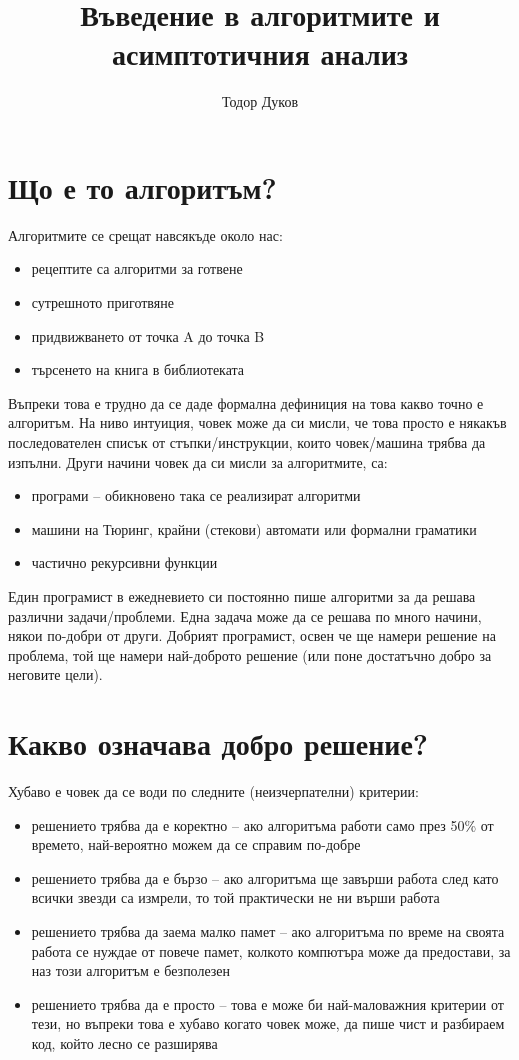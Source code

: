 \documentclass{article}
\title{Въведение в алгоритмите и асимптотичния анализ}
\author{Тодор Дуков}
\date{}
\theoremstyle{definition}
\theoremstyle{plain}
\theoremstyle{remark}
\theoremstyle{definition}
\begin{document}
\maketitle

\section*{Що е то алгоритъм?}

Алгоритмите се срещат навсякъде около нас:
\begin{itemize}
  \item рецептите са алгоритми за готвене
  \item сутрешното приготвяне
  \item придвижването от точка A до точка B
  \item търсенето на книга в библиотеката
\end{itemize}

Въпреки това е трудно да се даде формална дефиниция на това какво точно е алгоритъм.
На ниво интуиция, човек може да си мисли, че това просто е някакъв последователен списък от стъпки/инструкции, които човек/машина трябва да изпълни.
Други начини човек да си мисли за алгоритмите, са:
\begin{itemize}
  \item програми -- обикновено така се реализират алгоритми
  \item машини на Тюринг, крайни (стекови) автомати или формални граматики
  \item частично рекурсивни функции
\end{itemize}

Един програмист в ежедневието си постоянно пише алгоритми за да решава различни задачи/проблеми.
Една задача може да се решава по много начини, някои по-добри от други.
Добрият програмист, освен че ще намери решение на проблема, той ще намери най-доброто решение (или поне достатъчно добро за неговите цели).

\section*{Какво означава добро решение?}

Хубаво е човек да се води по следните (неизчерпателни) критерии:
\begin{itemize}
  \item решението трябва да е коректно -- ако алгоритъма работи само през 50\% от времето, най-вероятно можем да се справим по-добре
  \item решението трябва да е бързо -- ако алгоритъма ще завърши работа след като всички звезди са измрели, то той практически не ни върши работа
  \item решението трябва да заема малко памет -- ако алгоритъма по време на своята работа се нуждае от повече памет, колкото компютъра може да предостави, за наз този алгоритъм е безполезен
  \item решението трябва да е просто -- това е може би най-маловажния критерии от тези, но въпреки това е хубаво когато човек може, да пише чист и разбираем код, който лесно се разширява
\end{itemize}
\end{document}
